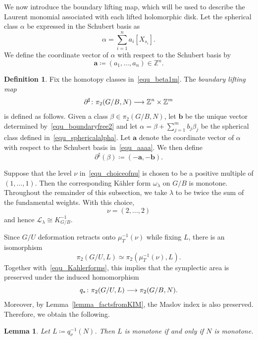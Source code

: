 \documentclass[11pt]{amsart}
\theoremstyle{plain}
\newtheorem{lemma}[theorem]{Lemma}
\theoremstyle{definition}
\newtheorem{definition}[theorem]{Definition}
\theoremstyle{remark}
\newcommand{\Z}{\mathbb{Z}}
\numberwithin{equation}{section} \numberwithin{table}{section}
\def\to{\mathchoice{\longrightarrow}{\rightarrow}{\rightarrow}{\rightarrow}}
\numberwithin{equation}{section}
\begin{document}
We now introduce the boundary lifting map, which will be used to describe the Laurent monomial associated with each lifted holomorphic disk. Let the spherical class $\alpha$ be expressed in the Schubert basis as
\begin{equation}\label{equ_alphaclass}
\alpha = \sum_{i=1}^n a_i [X_{s_i}]. 
\end{equation}
We define the coordinate vector of $\alpha$ with respect to the Schubert basis by
\begin{equation}\label{equ_aaaa}
\mathbf{a} \coloneqq  (a_1, \dots, a_n) \in \Z^n.
\end{equation}

\begin{definition}\label{def_boundaryliftingmap}
Fix the homotopy classes in~\eqref{equ_beta1m}. The \emph{boundary lifting map} 
$$
\partial^\sharp \colon \pi_2(G/B, N) \to \Z^n \times \Z^m
$$
is defined as follows. Given a class $\beta \in \pi_2(G/B, N)$, let $\mathbf{b}$ be the unique vector determined by~\eqref{equ_boundaryfree2} and let
$
\alpha=\beta + \sum_{j=1}^{m}b_j\beta_j
$
be the spherical class defined in~\eqref{equ_sphericalalpha}. Let $\mathbf{a}$ denote the coordinate vector of $\alpha$ with respect to the Schubert basis in~\eqref{equ_aaaa}. We then define
$$
\partial^\sharp (\beta) \coloneqq (-\mathbf{a}, -\mathbf{b}).
$$
\end{definition}

Suppose that the level $\nu$ in~\eqref{equ_choiceofnu} is chosen to be a positive multiple of $(1,\dots,1)$. Then the corresponding K\"{a}hler form $\omega_{\lambda}$ on $G/B$ is monotone. Throughout the remainder of this subsection, we take $\lambda$ to be twice the sum of the fundamental weights. With this choice,
\begin{equation}\label{equ_sumoffundweights}
\nu = (2, \dots, 2)
\end{equation}
and hence $\mathcal L_\lambda \cong K_{G/B}^{-1}$.

Since $G/U$ deformation retracts onto $\mu_T^{-1}(\nu)$ while fixing $L$, there is an isomorphism 
$$
\pi_2(G/U, L) \simeq \pi_2(\mu_T^{-1}(\nu), L).
$$ 
Together with~\eqref{equ_Kahlerforms}, this implies that the symplectic area is preserved under the induced homomorphism
$$
q_* \colon \pi_2(G/U, L) \to \pi_2(G/B,N).
$$ 
Moreover, by Lemma~\ref{lemma_factsfromKIM}, the Maslov index is also preserved. Therefore, we obtain the following.

\begin{lemma}\label{lemma_monotoneLagrangiantori}
Let $L \coloneqq q_\nu^{-1}(N)$. Then $L$ is monotone if and only if $N$ is monotone.
\end{lemma}
\end{document}
